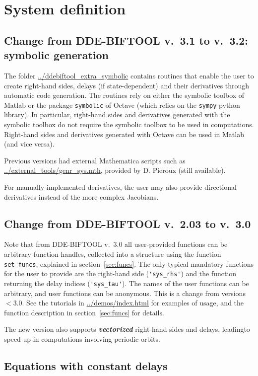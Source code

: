 \documentclass[10pt]{scrartcl}
\newcommand{\DDEBIFCODE}{\textsc{DDE-BIFTOOL}}
\newcommand{\demobase}{\url{../demos/index.html}}
\newcommand{\blist}[1]{\mbox{\lstinline!#1!}}
\begin{document}
\section{System definition}\label{sec:system:def}

\subsection{Change from \DDEBIFCODE{} v.~3.1 to v.~3.2: symbolic generation}
\label{sec:symbolic}
The folder \url{../ddebiftool_extra_symbolic} contains routines that
enable the user to create right-hand sides, delays (if
state-dependent) and their derivatives through automatic code
generation. The routines rely on either the symbolic toolbox of Matlab
or the package \texttt{symbolic} of Octave (which relies on the
\texttt{sympy} python library). In particular, right-hand sides and
derivatives generated with the symbolic toolbox do not require the
symbolic toolbox to be used in computations. Right-hand sides and
derivatives generated with Octave can be used in Matlab (and vice
versa).

Previous versions had external Mathematica scripts such as
\url{../external_tools/genr_sys.mth}, provided by D. Pieroux (still available).

For manually implemented derivatives, the user may also provide
directional derivatives instead of the more complex Jacobians.
\subsection{Change from \DDEBIFCODE{} v.~2.03 to
  v.~3.0} Note that from \DDEBIFCODE{} v.~3.0 all
user-provided functions can be arbitrary function handles, collected
into a structure using the function \blist{set_funcs}, explained in
section~\ref{sec:funcs}. The only typical mandatory functions for the
user to provide are the right-hand side (\blist{'sys_rhs'}) and the
function returning the delay indices (\blist{'sys_tau'}). The names of
the user functions can be arbitrary, and user functions can be
anonymous. This is a change from versions $<3.0$. See the tutorials
in \demobase{} for examples of usage, and the function description in
section~\ref{sec:funcs} for details.

The new version also supports \textbf{\emph{vectorized}} right-hand
sides and delays, leadingto speed-up in computations involving periodic orbits.
\subsection{Equations with constant delays}\label{sys_def1}
\end{document}

